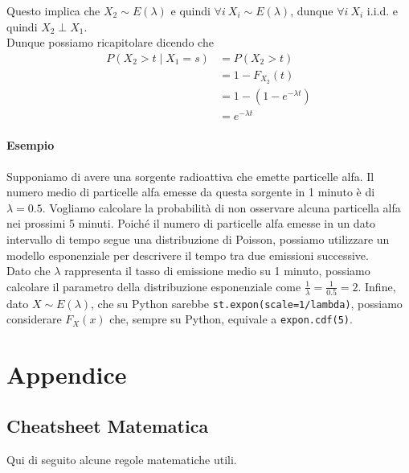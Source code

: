 \documentclass[11pt]{report}
\begin{document}
Questo implica che $X_2 \sim E(\lambda)$ e quindi $\forall i\ X_i \sim E(\lambda)$, dunque $\forall i\ X_i$ i.i.d. e quindi $X_2 \perp X_1$.\\
Dunque possiamo ricapitolare dicendo che
\begin{equation}
	\begin{split}
		P(X_2 > t \mid X_1 = s) & = P(X_2 > t)\\
		& = 1 - F_{X_2}(t)\\
		& = 1 - \left( 1 - e^{- \lambda t} \right)\\
		& = e^{- \lambda t}
	\end{split}
\end{equation}
\subsection{Esempio}
Supponiamo di avere una sorgente radioattiva che emette particelle alfa. Il numero medio di particelle alfa emesse da questa sorgente in 1 minuto è di $\lambda = 0.5$. Vogliamo calcolare la probabilità di non osservare alcuna particella alfa nei prossimi 5 minuti. Poiché il numero di particelle alfa emesse in un dato intervallo di tempo segue una distribuzione di Poisson, possiamo utilizzare un modello esponenziale per descrivere il tempo tra due emissioni successive.\\
Dato che $\lambda$ rappresenta il tasso di emissione medio su 1 minuto, possiamo calcolare il parametro della distribuzione esponenziale come $\frac{1}{\lambda} = \frac{1}{0.5} = 2$. Infine, dato $X \sim E(\lambda)$, che su Python sarebbe \texttt{st.expon(scale=1/lambda)}, possiamo considerare $F_X(x)$ che, sempre su Python, equivale a \texttt{expon.cdf(5)}.

\part{Appendice}

\chapter{Cheatsheet Matematica}
Qui di seguito alcune regole matematiche utili.
\end{document}
